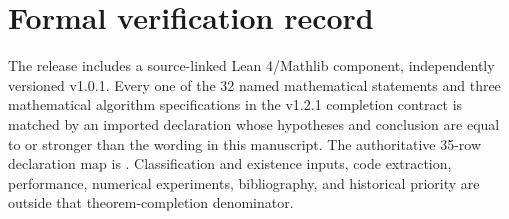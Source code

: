 \documentclass[11pt]{article}
\theoremstyle{definition}
\theoremstyle{remark}
\begin{document}
\section{Formal verification record}

The release includes a source-linked Lean 4/Mathlib component, independently versioned v1.0.1. Every one of the 32 named mathematical statements and three mathematical algorithm specifications in the v1.2.1 completion contract is matched by an imported declaration whose hypotheses and conclusion are equal to or stronger than the wording in this manuscript. The authoritative 35-row declaration map is . Classification and existence inputs, code extraction, performance, numerical experiments, bibliography, and historical priority are outside that theorem-completion denominator.
\end{document}

